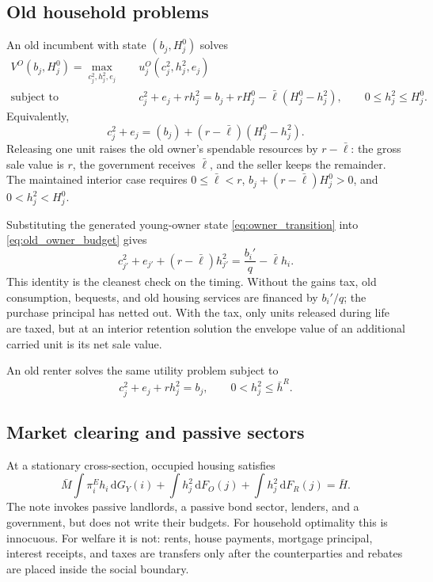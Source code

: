 \documentclass[11pt]{article}
\newcommand{\dd}{\mathrm d}
\newcommand{\1}{\mathbf 1}
\newcommand{\ellbar}{\bar\ell}
\begin{document}
\subsection{Old household problems}

An old incumbent with state $(b_j,H_j^0)$ solves
\begin{align}
V^O(b_j,H_j^0)=\max_{c_j^2,h_j^2,e_j}\quad
&u_j^O(c_j^2,h_j^2,e_j) \\
\text{subject to}\quad
&c_j^2+e_j+r h_j^2
=b_j+rH_j^0-\ellbar(H_j^0-h_j^2),
\qquad 0\le h_j^2\le H_j^0.
\label{eq:old_owner_budget}
\end{align}
Equivalently,
\begin{equation}
c_j^2+e_j=(b_j)+(r-\ellbar)(H_j^0-h_j^2).
\label{eq:old_release_budget}
\end{equation}
Releasing one unit raises the old owner's spendable resources by
$r-\ellbar$: the gross sale value is $r$, the government receives $\ellbar$,
and the seller keeps the remainder. The maintained interior case requires
$0\le\ellbar<r$, $b_j+(r-\ellbar)H_j^0>0$, and
$0<h_j^2<H_j^0$.

Substituting the generated young-owner state \eqref{eq:owner_transition} into
\eqref{eq:old_owner_budget} gives
\begin{equation}
c_{j'}^2+e_{j'}+(r-\ellbar)h_{j'}^2
=\frac{b_i'}q-\ellbar h_i.
\label{eq:generated_old_budget}
\end{equation}
This identity is the cleanest check on the timing. Without the gains tax, old
consumption, bequests, and old housing services are financed by $b_i'/q$; the
purchase principal has netted out. With the tax, only units released during
life are taxed, but at an interior retention solution the envelope value of an
additional carried unit is its net sale value.

An old renter solves the same utility problem subject to
\begin{equation}
c_j^2+e_j+r h_j^2=b_j,
\qquad 0<h_j^2\le\bar h^R.
\label{eq:old_renter_budget}
\end{equation}

\subsection{Market clearing and passive sectors}

At a stationary cross-section, occupied housing satisfies
\begin{equation}
\bar M\int \pi_i^E h_i\,\dd G_Y(i)
+\int h_j^2\,\dd F_O(j)
+\int h_j^2\,\dd F_R(j)=\bar H.
\label{eq:housing_clearing}
\end{equation}
The note invokes passive landlords, a passive bond sector, lenders, and a
government, but does not write their budgets. For household optimality this is
innocuous. For welfare it is not: rents, house payments, mortgage principal,
interest receipts, and taxes are transfers only after the counterparties and
rebates are placed inside the social boundary.
\end{document}
